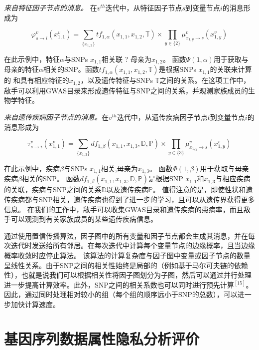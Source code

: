 \emph{来自特征因子节点的消息。} 在$v^{th}$迭代中，从特征因子节点$s$到变量节点$i$的消息形成为

\begin{equation}
\label{eq:trait-message}
\varphi_{s \rightarrow i}^v(x_{1,1}^v) =  \sum_{\{x_{1,2}\}}tf_{1,\alpha}(x_{1,1},x_{1,2},\mathbb{T}) \times  \prod_{y \in \{2\}} \mu_{x_{1,y} \rightarrow s}^v(x_{1,y}^v)
\end{equation}

在此示例中，特征$\alpha$与SNPs $x_{1,1}$相关联
? 母亲为$x_{1,2}$。 函数$\Psi(1,\alpha)$用于获取与母亲的特征$\alpha$相关的SNP。函数$tf_{1,\alpha}(x_{1,1},x_{1,2},\mathbb{T})$是根据SNPs $x_{1,1}$的关联来计算的 和具有相应特征的$x_{1,2}$，以及遗传特征与SNPs $\mathbb{T}$之间的关系。在这项工作中，敌手可以利用GWAS目录来形成遗传特征与SNP之间的关系，并观测家族成员的生物学特征。

\emph{来自遗传疾病因子节点的消息。}在$v^{th}$迭代中，从遗传疾病因子节点$t$到变量节点$i$的消息形成为

\begin{equation}
\label{eq:disease-messages}
\tau_{s \rightarrow i}^v(x_{1,1}^v) =  \sum_{\{x_{1,3}\}}df_{1,\beta}(x_{1,1},x_{1,3},\mathbb{D},\mathbb{P}) \times  \prod_{y \in \{3\}} \mu_{x_{1,y} \rightarrow s}^v(x_{1,y}^v)
\end{equation}

在此示例中，疾病$\beta$与SNPs $x_{1,1}$相关,母亲为$x_{1,3}$。 函数$\Phi(1,\beta)$用于获取与母亲疾病$\beta$相关的SNP。 函数$df_{1,\beta}(x_{1,1},x_{1,3},\mathbb{D}, \mathbb{P})$是根据SNP $x_{1,1}$和$x_{1,3}$与相应疾病的关联，疾病与SNP之间的关系$\mathbb{D}$以及遗传疾病$\mathbb{P}$。
值得注意的是，即使性状和遗传疾病都与SNP相关，遗传疾病也得到了进一步的学习，且可以从遗传界获得更多信息。 在我们的工作中，敌手可以收集GWAS目录和遗传疾病的患病率，而且敌手可以观测到有关家族成员的某些遗传疾病信息。

通过使用置信传播算法，因子图中的所有变量和因子节点都会生成其消息，并在每次迭代时发送给所有邻居。在每次迭代中计算每个变量节点的边缘概率，且当边缘概率收敛时应停止算法。
该算法的计算复杂度与因子图中变量或因子节点的数量呈线性关系。由于SNP之间的相关性始终是局部的（例如基于马尔可夫链的依赖性），也就是说我们可以根据相关性将因子图划分为子图，然后可以通过并行处理进一步提高计算效率。此外，SNP之间的相关系数也可以同时进行预先计算$^{[15]}$。因此，通过同时处理相对较小的组（每个组的顺序远小于SNP的总数），可以进一步加快计算速度。


\section{基因序列数据属性隐私分析评价} 


